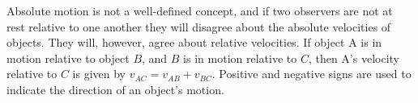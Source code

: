 \begin{summary}
\begin{summarytext}
Absolute motion is not a well-defined concept, and if two
observers are not at rest relative to one another they will
disagree about the absolute velocities of objects. They
will, however, agree about relative velocities. If object A
is in motion relative to object $B$, and $B$ is in motion
relative to $C$, then A's velocity relative to $C$ is given
by $v_{AC}=v_{AB}+v_{BC}$. Positive and negative signs are
used to indicate the direction of an object's motion.

\end{summarytext}

\end{summary}
